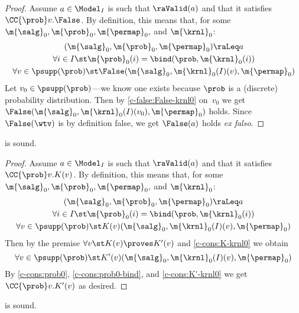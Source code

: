 \documentclass[acmsmall,nonacm,screen,appendix]{acmart}
\begin{document}
\begin{proof}
  Assume $a \in \Model_I$ is such that
  $\raValid(a)$ and that it satisfies
  $ \CC{\prob} v.\False $.
  By definition, this means that,
  for some $ \m{\salg}_0, \m{\prob}_0,\m{\permap}_0,$ and $ \m{\krnl}_0 $:
  \begin{gather}
    (\m{\salg}_0, \m{\prob}_0,\m{\permap}_0) \raLeq a
    \label{c-false:prob0}
    \\
    \forall i\in I\st
      \m{\prob}_0(i) = \bind(\prob, \m{\krnl}_0(i))
    \label{c-false:prob0-bind}
    \\
    \forall v \in \psupp(\prob) \st
      \False(\m{\salg}_0, \m{\krnl}_0(I)(v), \m{\permap}_0)
    \label{c-false:False-krnl0}
  \end{gather}
  Let $v_0 \in \psupp(\prob)$---we know one exists because $\prob$
  is a (discrete) probability distribution.
  Then by \eqref{c-false:False-krnl0} on~$v_0$
  we get $\False(\m{\salg}_0, \m{\krnl}_0(I)(v_0), \m{\permap}_0)$ holds.
  Since $\False(\wtv)$ is by definition false,
  we get $\False(a)$ holds \emph{ex falso}.
\end{proof} \begin{lemma}
\label{proof:c-cons}
   is sound.
\end{lemma}

\begin{proof}
  Assume $a \in \Model_I$ is such that
  $\raValid(a)$ and that it satisfies
  $ \CC{\prob} v.K(v) $.
  By definition, this means that,
  for some $ \m{\salg}_0, \m{\prob}_0,\m{\permap}_0,$ and $ \m{\krnl}_0 $:
  \begin{gather}
    (\m{\salg}_0, \m{\prob}_0,\m{\permap}_0) \raLeq a
    \label{c-cons:prob0}
    \\
    \forall i\in I\st
      \m{\prob}_0(i) = \bind(\prob, \m{\krnl}_0(i))
    \label{c-cons:prob0-bind}
    \\
    \forall v \in \psupp(\prob) \st
      K(v)(\m{\salg}_0, \m{\krnl}_0(I)(v), \m{\permap}_0)
    \label{c-cons:K-krnl0}
  \end{gather}
  Then by the premise $\forall v\st K(v) \proves K'(v)$
  and \eqref{c-cons:K-krnl0} we obtain
  \begin{equation}
    \forall v \in \psupp(\prob) \st
      K'(v)(\m{\salg}_0, \m{\krnl}_0(I)(v), \m{\permap}_0)
    \label{c-cons:K'-krnl0}
  \end{equation}
  By
  \eqref{c-cons:prob0}, \eqref{c-cons:prob0-bind}, and \eqref{c-cons:K'-krnl0}
  we get $ \CC{\prob} v.K'(v) $ as desired.
\end{proof} \begin{lemma}
\label{proof:c-frame}
   is sound.
\end{lemma}
\end{document}
